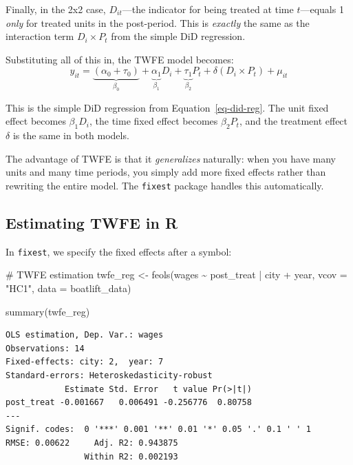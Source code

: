 \documentclass[
  letterpaper,
  DIV=11,
  numbers=noendperiod]{scrreprt}
\newenvironment{Shaded}{\begin{snugshade}}{\end{snugshade}}
\newcommand{\AttributeTok}[1]{\textcolor[rgb]{0.40,0.45,0.13}{#1}}
\newcommand{\CommentTok}[1]{\textcolor[rgb]{0.37,0.37,0.37}{#1}}
\newcommand{\FunctionTok}[1]{\textcolor[rgb]{0.28,0.35,0.67}{#1}}
\newcommand{\NormalTok}[1]{\textcolor[rgb]{0.00,0.23,0.31}{#1}}
\newcommand{\OtherTok}[1]{\textcolor[rgb]{0.00,0.23,0.31}{#1}}
\newcommand{\SpecialCharTok}[1]{\textcolor[rgb]{0.37,0.37,0.37}{#1}}
\newcommand{\StringTok}[1]{\textcolor[rgb]{0.13,0.47,0.30}{#1}}
\begin{document}
Finally, in the 2x2 case, \(D_{it}\)---the indicator for being treated
at time \(t\)---equals 1 \emph{only} for treated units in the
post-period. This is \emph{exactly} the same as the interaction term
\(D_i \times P_t\) from the simple DiD regression.

Substituting all of this in, the TWFE model becomes: \[
y_{it} = \underbrace{(\alpha_0 + \tau_0)}_{\beta_0} + \underbrace{\alpha_1}_{\beta_1} D_i + \underbrace{\tau_1}_{\beta_2} P_t + \delta(D_i \times P_t) + \mu_{it}
\]

This is the simple DiD regression from Equation~\ref{eq-did-reg}. The
unit fixed effect becomes \(\beta_1 D_i\), the time fixed effect becomes
\(\beta_2 P_t\), and the treatment effect \(\delta\) is the same in both
models.

The advantage of TWFE is that it \emph{generalizes} naturally: when you
have many units and many time periods, you simply add more fixed effects
rather than rewriting the entire model. The \texttt{fixest} package
handles this automatically.

\subsection{Estimating TWFE in R}\label{estimating-twfe-in-r}

In \texttt{fixest}, we specify the fixed effects after a
\texttt{\textbar{}} symbol:

\begin{Shaded}
\begin{Highlighting}[]
\CommentTok{\# TWFE estimation}
\NormalTok{twfe\_reg }\OtherTok{\textless{}{-}} \FunctionTok{feols}\NormalTok{(wages }\SpecialCharTok{\textasciitilde{}}\NormalTok{ post\_treat }\SpecialCharTok{|}\NormalTok{ city }\SpecialCharTok{+}\NormalTok{ year,}
                  \AttributeTok{vcov =} \StringTok{"HC1"}\NormalTok{,}
                  \AttributeTok{data =}\NormalTok{ boatlift\_data)}

\FunctionTok{summary}\NormalTok{(twfe\_reg)}
\end{Highlighting}
\end{Shaded}

\begin{verbatim}
OLS estimation, Dep. Var.: wages
Observations: 14
Fixed-effects: city: 2,  year: 7
Standard-errors: Heteroskedasticity-robust 
            Estimate Std. Error   t value Pr(>|t|) 
post_treat -0.001667   0.006491 -0.256776  0.80758 
---
Signif. codes:  0 '***' 0.001 '**' 0.01 '*' 0.05 '.' 0.1 ' ' 1
RMSE: 0.00622     Adj. R2: 0.943875
                Within R2: 0.002193
\end{verbatim}
\end{document}
